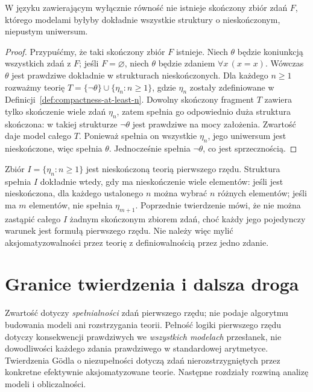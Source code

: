 \begin{twierdzenie}\label{thm:compactness-infinity-not-finitely-axiomatizable-47}
W języku zawierającym wyłącznie równość nie istnieje skończony zbiór
zdań $F$, którego modelami byłyby dokładnie wszystkie struktury
o nieskończonym, niepustym uniwersum.
\end{twierdzenie}
\begin{proof}
Przypuśćmy, że taki skończony zbiór $F$ istnieje. Niech $\theta$
będzie koniunkcją wszystkich zdań z $F$; jeśli $F=\varnothing$,
niech $\theta$ będzie zdaniem $\forall x\,(x=x)$.
Wówczas $\theta$ jest prawdziwe dokładnie w strukturach nieskończonych.
Dla każdego $n\ge1$ rozważmy teorię
$T=\{\neg\theta\}\cup\{\eta_n:n\ge1\}$, gdzie $\eta_n$
zostały zdefiniowane w Definicji~\ref{def:compactness-at-least-n}.
Dowolny skończony fragment $T$ zawiera tylko skończenie wiele zdań
$\eta_n$, zatem spełnia go odpowiednio duża struktura skończona:
w takiej strukturze $\neg\theta$ jest prawdziwe na mocy założenia.
Zwartość daje model całego $T$. Ponieważ spełnia on wszystkie
$\eta_n$, jego uniwersum jest nieskończone, więc spełnia $\theta$.
Jednocześnie spełnia $\neg\theta$, co jest sprzecznością.
\end{proof}

\begin{przyklad}\label{ex:compactness-infinity-theory-47}
Zbiór $I=\{\eta_n:n\ge1\}$ jest nieskończoną teorią pierwszego
rzędu. Struktura spełnia $I$ dokładnie wtedy, gdy ma nieskończenie
wiele elementów: jeśli jest nieskończona, dla każdego ustalonego
$n$ można wybrać $n$ różnych elementów; jeśli ma $m$ elementów,
nie spełnia $\eta_{m+1}$. Poprzednie twierdzenie mówi, że nie
można zastąpić całego $I$ żadnym skończonym zbiorem zdań,
choć każdy jego pojedynczy warunek jest formułą pierwszego rzędu.
Nie należy więc mylić aksjomatyzowalności przez teorię
z definiowalnością przez jedno zdanie.
\end{przyklad}

\section{Granice twierdzenia i dalsza droga}
Zwartość dotyczy \emph{spełnialności} zdań pierwszego rzędu; nie podaje algorytmu budowania modeli ani rozstrzygania teorii. Pełność logiki pierwszego rzędu dotyczy konsekwencji prawdziwych we \emph{wszystkich modelach} przesłanek, nie dowodliwości każdego zdania prawdziwego w standardowej arytmetyce. Twierdzenia Gödla o niezupełności dotyczą zdań nierozstrzygniętych przez konkretne efektywnie aksjomatyzowane teorie. Następne rozdziały rozwiną analizę modeli i obliczalności.